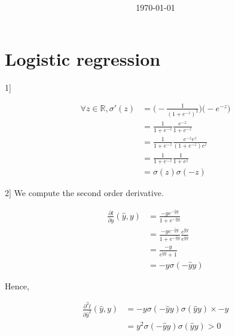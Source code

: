\documentclass[
10pt, %
a4paper, %
oneside, %
headinclude,footinclude, %
BCOR5mm, %
]{scrartcl}
\title{\normalfont{FTML Exercices 5 solutions}\\
}
\author{\spacedlowsmallcaps{}
}
\date{\today}
\begin{document}
\renewcommand{\sectionmark}[1]{\markright{\spacedlowsmallcaps{#1}}}
\lehead{\mbox{\llap{\small\thepage\kern1em\color{halfgray} \vline}\color{halfgray}\hspace{0.5em}\rightmark\hfil}} 
\pagestyle{scrheadings}
\maketitle 
\setcounter{tocdepth}{3} 

\tableofcontents

\section{\large\color{Blue}Logistic regression}

1]

\begin{equation}
    \begin{aligned}
        \label{eq:}
	\forall z\in \mathbb{R}, \sigma'(z) &= \big(- \frac{1}{(1+e^{-z})^2}\big)\big( -e^{-z}\big)\\
	&= \frac{1}{1+e^{-z}} \frac{e^{-z}}{1+e^{-z}} \\
	&= \frac{1}{1+e^{-z}} \frac{e^{-z}e^z}{(1+e^{-z})e^z} \\
	&= \frac{1}{1+e^{-z}} \frac{1}{1+e^{z}} \\
	&= \sigma(z)\sigma(-z)
    \end{aligned}
\end{equation}


2] We compute the second order derivative.

\begin{equation}
    \begin{aligned}
        \label{eq:}
	\frac{\partial l}{\partial \hat{y}}( \hat{y}, y) &= \frac{-ye^{- \hat{y}y}}{1+e^{- \hat{y}y}}\\
	&= \frac{-ye^{- \hat{y}y}}{1+e^{- \hat{y}y}}\frac{e^{\hat{y}y}}{e^{\hat{y}y}}\\
	&= \frac{-y}{e^{\hat{y}y}+1}\\
	&= -y\sigma(-\hat{y}y)
    \end{aligned}
\end{equation}

Hence,

\begin{equation}
    \begin{aligned}
        \label{eq:}
	\frac{\partial^2 l}{\partial \hat{y}^2}( \hat{y}, y) &= -y\sigma(-\hat{y}y)\sigma(\hat{y}y)\times -y\\
	&= y^2\sigma(-\hat{y}y)\sigma(\hat{y}y)>0\\
    \end{aligned}
\end{equation}
\end{document}
